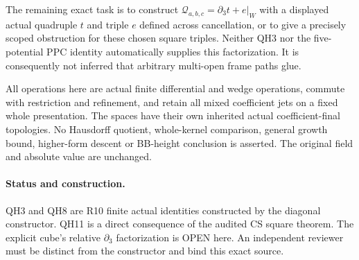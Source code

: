 The remaining exact task is to construct
$\mathcal Q_{a,b,c}=\partial_3t+e|_W$ with a displayed actual
quadruple $t$ and triple $e$ defined across cancellation, or to
give a precisely scoped obstruction for these chosen square
triples.  Neither QH3 nor the five-potential PPC identity
automatically supplies this factorization.  It is consequently
not inferred that arbitrary multi-open frame paths glue.

All operations here are actual finite differential and wedge
operations, commute with restriction and refinement, and retain
all mixed coefficient jets on a fixed whole presentation.
The spaces have their own inherited actual coefficient-final
topologies.  No Hausdorff quotient, whole-kernel comparison,
general growth bound, higher-form descent or BB-height conclusion
is asserted.  The original field and absolute value are unchanged.

\paragraph{Status and construction.}
QH3 and QH8 are R10 finite actual identities constructed by the
diagonal constructor.  QH11 is a direct consequence of the
audited CS square theorem.  The explicit cube's relative
$\partial_3$ factorization is OPEN here.  An independent reviewer
must be distinct from the constructor and bind this exact source.

